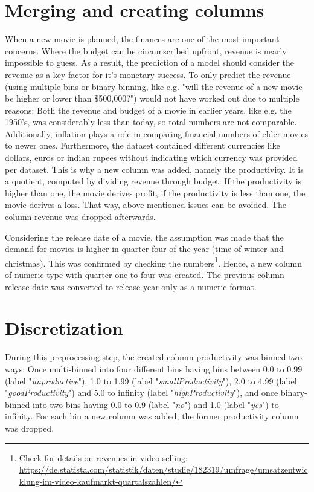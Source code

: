 \section{Merging and creating columns}
\label{sec:merge_create}
When a new movie is planned, the finances are one of the most important concerns. Where the budget can be circumscribed upfront, revenue is nearly impossible to guess. As a result, the prediction of a model should consider the revenue as a key factor for it's monetary success. To only predict the revenue (using multiple bins or binary binning, like e.g. "will the revenue of a new movie be higher or lower than \$500,000?") would not have worked out due to multiple reasons: Both the revenue and budget of a movie in earlier years, like e.g. the 1950's, was considerably less than today, so total numbers are not comparable. Additionally, inflation plays a role in comparing financial numbers of elder movies to newer ones. Furthermore, the dataset contained different currencies like dollars, euros or indian rupees without indicating which currency was provided per dataset. This is why a new column was added, namely the productivity. It is a quotient, computed by dividing revenue through budget. If the productivity is higher than one, the movie derives profit, if the productivity is less than one, the movie derives a loss. That way, above mentioned issues can be avoided. The column revenue was dropped afterwards.

Considering the release date of a movie, the assumption was made that the demand for movies is higher in quarter four of the year (time of winter and christmas). This was confirmed by checking the numbers\footnote{Check for details on revenues in video-selling: \hyperref{https://de.statista.com/statistik/daten/studie/182319/umfrage/umsatzentwicklung-im-video-kaufmarkt-quartalszahlen/}{link}{Statista revenue movies}{https://de.statista.com/statistik/daten/studie/182319/umfrage/umsatzentwicklung-im-video-kaufmarkt-quartalszahlen/}}. Hence, a new column of numeric type with quarter one to four was created. The previous column release date was converted to release year only as a numeric format.

\section{Discretization}
During this preprocessing step, the created column productivity was binned two ways: Once multi-binned into four different bins having bins between 0.0 to 0.99 (label "\textit{unproductive}"), 1.0 to 1.99 (label "\textit{smallProductivity}"), 2.0 to 4.99 (label "\textit{goodProductivity}") and 5.0 to infinity (label "\textit{highProductivity}"), and once binary-binned into two bins having 0.0 to 0.9 (label "\textit{no}") and 1.0 (label "\textit{yes}") to infinity. For each bin a new column was added, the former productivity column was dropped.

